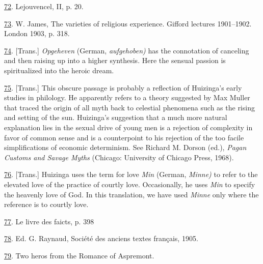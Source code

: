 \protect\hypertarget{23_NOTES.xhtmlux5cux23id_1791}{\protect\hyperlink{10_Chapter_Three__THE_HEROIC_DREAM.xhtmlux5cux23id_1790}{72}}.
Lejouvencel, II, p. 20.

\protect\hypertarget{23_NOTES.xhtmlux5cux23id_1789}{\protect\hyperlink{10_Chapter_Three__THE_HEROIC_DREAM.xhtmlux5cux23id_1788}{73}}.
W. James, The varieties of religious experience. Gifford lectures
1901--1902. London 1903, p. 318.

\protect\hypertarget{23_NOTES.xhtmlux5cux23id_1787}{\protect\hyperlink{10_Chapter_Three__THE_HEROIC_DREAM.xhtmlux5cux23id_1786}{74}}.
{[}Trans.{]} \emph{Opgeheven} (German, \emph{aufgehoben)} has the
connotation of canceling and then raising up into a higher synthesis.
Here the sensual passion is spiritualized into the heroic dream.

\protect\hypertarget{23_NOTES.xhtmlux5cux23id_1785}{\protect\hyperlink{10_Chapter_Three__THE_HEROIC_DREAM.xhtmlux5cux23id_1784}{75}}.
{[}Trans.{]} This obscure passage is probably a reflection of Huizinga's
early studies in philology. He apparently refers to a theory suggested
by Max Muller that traced the origin of all myth back to celestial
phenomena such as the rising and setting of the sun. Huizinga's
suggestion that a much more natural explanation lies in the sexual drive
of young men is a rejection of complexity in favor of common sense and
is a counterpoint to his rejection of the too facile simplifications of
economic determinism. See Richard M. Dorson (ed.), \emph{Pagan Customs
and Savage Myths} (Chicago: University of Chicago Press, 1968).

\protect\hypertarget{23_NOTES.xhtmlux5cux23id_1783}{\protect\hyperlink{10_Chapter_Three__THE_HEROIC_DREAM.xhtmlux5cux23id_1782}{76}}.
{[}Trans.{]} Huizinga uses the term for love \emph{Min} (German,
\emph{Minne)} to refer to the elevated love of the practice of courtly
love. Occasionally, he uses \emph{Min} to specify the heavenly love of
God. In this translation, we have used \emph{Minne} only where the
reference is to courtly love.

\protect\hypertarget{23_NOTES.xhtmlux5cux23id_1781}{\protect\hyperlink{10_Chapter_Three__THE_HEROIC_DREAM.xhtmlux5cux23id_1780}{77}}.
Le livre des faicts, p. 398

\protect\hypertarget{23_NOTES.xhtmlux5cux23id_1779}{\protect\hyperlink{10_Chapter_Three__THE_HEROIC_DREAM.xhtmlux5cux23id_1778}{78}}.
Ed. G. Raynaud, Société des anciens textes français, 1905.

\protect\hypertarget{23_NOTES.xhtmlux5cux23id_1777}{\protect\hyperlink{10_Chapter_Three__THE_HEROIC_DREAM.xhtmlux5cux23id_1776}{79}}.
Two heros from the Romance of Aspremont.


